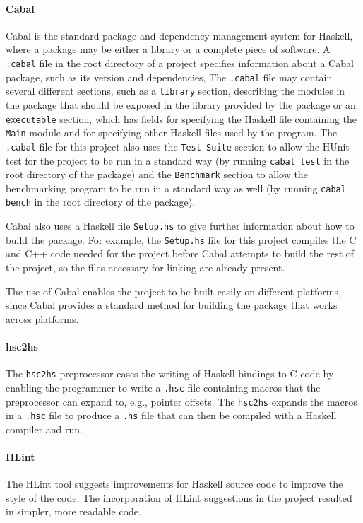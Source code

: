 \documentclass[12pt,a4paper,twoside,openright]{report}
\begin{document}
\paragraph{Cabal}{
Cabal is the standard package and dependency management system for Haskell,
where a package may be either a library or a complete piece of software.
A \verb,.cabal, file in the root directory of a project specifies
information about a Cabal package, such as its version and dependencies,
The \verb,.cabal, file may contain several different sections, such as a
\verb,library, section, describing the modules in the package that should be
exposed in the library provided by the package or an \verb,executable, section,
which has fields for specifying the Haskell file containing the \verb,Main,
module and for specifying other Haskell files used by the program.
The \verb,.cabal, file for this project also uses the \verb,Test-Suite, section
to allow the HUnit test for the project to be run in a standard way (by running
\verb,cabal test, in the root directory of the package) and the \verb,Benchmark,
section to allow the benchmarking program to be run in a standard way as well
(by running \verb,cabal bench, in the root directory of the package).

Cabal also uses a Haskell file \verb,Setup.hs, to give further information
about how to build the package. For example, the \verb,Setup.hs, file
for this project compiles the C and C++ code needed for the project before
Cabal attempts to build the rest of the project, so the files necessary
for linking are already present.

The use of Cabal enables the project to be built easily on different platforms,
since Cabal provides a standard method for building the package that works
across platforms.}

\paragraph{hsc2hs}{
The \verb,hsc2hs, preprocessor eases the writing of Haskell bindings to C
code by enabling the programmer to write a \verb,.hsc, file containing
macros that the preprocessor can expand to, e.g., pointer offsets. The
\verb,hsc2hs, expands the macros in a \verb,.hsc, file to produce a
\verb,.hs, file that can then be compiled with a Haskell compiler and run.
}

\paragraph{HLint}{
The HLint tool suggests improvements for Haskell source code to improve
the style of the code. The incorporation of HLint suggestions in
the project resulted in simpler, more readable code.
}
\end{document}
